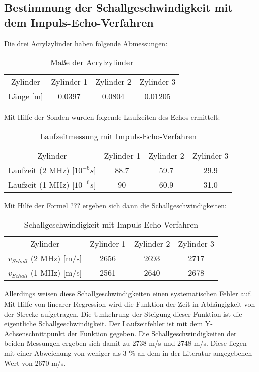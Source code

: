 \documentclass[11pt,ngerman,a4paper]{article}
\begin{document}
\subsection{Bestimmung der Schallgeschwindigkeit mit dem Impuls-Echo-Verfahren}
Die drei Acrylzylinder haben folgende Abmessungen:
 \begin{table}[h]
\centering
 \begin{tabular}{|c||c|c|c|}
 Zylinder & Zylinder 1 & Zylinder 2 & Zylinder 3 \\
  Länge [m] & 0.0397 & 0.0804 & 0.01205 \\
 \end{tabular}
\caption{Maße der Acrylzylinder}
\end{table}
\newline Mit Hilfe der Sonden wurden folgende Laufzeiten des Echos ermittelt:
 \begin{table}[h]
\centering
 \begin{tabular}{|c||c|c|c|}
 Zylinder & Zylinder 1 & Zylinder 2 & Zylinder 3 \\
 Laufzeit (2 MHz) [$10^{-6}s$] & 88.7 & 59.7 & 29.9 \\
 Laufzeit (1 MHz) [$10^{-6}s$] & 90  & 60.9 & 31.0 \\
 \end{tabular}
\caption{Laufzeitmessung mit Impuls-Echo-Verfahren}
\end{table}
\newline
Mit Hilfe der Formel ??? ergeben sich dann die Schallgeschwindigkeiten:
\begin{table}[h]
\centering
 \begin{tabular}{|c||c|c|c|}
 Zylinder & Zylinder 1 & Zylinder 2 & Zylinder 3 \\
 $v_{Schall}$ (2 MHz) [m/s] & 2656 & 2693 & 2717 \\
 $v_{Schall}$ (1 MHz) [m/s] & 2561  & 2640 & 2678 \\
 \end{tabular}
\caption{Schallgeschwindigkeit mit Impuls-Echo-Verfahren}
\end{table}
\newline
Allerdings weisen diese Schallgeschwindigkeiten einen systematischen Fehler auf. Mit Hilfe von linearer Regression wird die Funktion der Zeit in Abhängigkeit von der Strecke aufgetragen. Die Umkehrung der Steigung dieser Funktion ist die eigentliche Schallgeschwindigkeit. Der Laufzeitfehler ist mit dem Y-Achsenschnittpunkt der Funktion gegeben. Die Schallgeschwindigkeiten der beiden Messungen ergeben sich damit zu 2738 m/s und 2748 m/s.
Diese liegen mit einer Abweichung von weniger als 3 \%  an dem in der Literatur angegebenen Wert von 2670 m/s.
\end{document}
